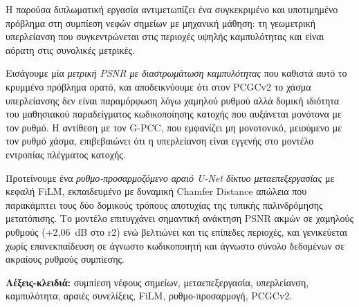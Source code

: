 Η παρούσα διπλωματική εργασία αντιμετωπίζει ένα συγκεκριμένο και υποτιμημένο
πρόβλημα στη συμπίεση νεφών σημείων με μηχανική μάθηση: τη γεωμετρική υπερλείανση
που συγκεντρώνεται στις περιοχές υψηλής καμπυλότητας και είναι αόρατη στις
συνολικές μετρικές.

Εισάγουμε μία \emph{μετρική PSNR με διαστρωμάτωση καμπυλότητας} που καθιστά
αυτό το κρυμμένο πρόβλημα ορατό, και αποδεικνύουμε ότι στον PCGCv2 το χάσμα
υπερλείανσης δεν είναι παραμόρφωση λόγω χαμηλού ρυθμού αλλά δομική ιδιότητα του
μαθησιακού παραδείγματος κωδικοποίησης κατοχής που αυξάνεται μονότονα με τον ρυθμό.
Η αντίθεση με τον G-PCC, που εμφανίζει μη μονοτονικό, μειούμενο με τον ρυθμό
χάσμα, επιβεβαιώνει ότι η υπερλείανση είναι εγγενής στο μοντέλο εντροπίας
πλέγματος κατοχής.

Προτείνουμε ένα \emph{ρυθμο-προσαρμοζόμενο αραιό U-Net δίκτυο μεταεπεξεργασίας}
με κεφαλή FiLM, εκπαιδευμένο με δυναμική Chamfer Distance απώλεια που παρακάμπτει
τους δύο δομικούς τρόπους αποτυχίας της τυπικής παλινδρόμησης μετατόπισης.
Το μοντέλο επιτυγχάνει σημαντική ανάκτηση PSNR ακμών σε χαμηλούς ρυθμούς
(+2,06~dB στο r2) ενώ βελτιώνει και τις επίπεδες περιοχές, και γενικεύεται χωρίς
επανεκπαίδευση σε άγνωστο κωδικοποιητή και άγνωστο σύνολο δεδομένων σε ακραίους
ρυθμούς συμπίεσης.

\vspace{1em}
\noindent\textbf{Λέξεις-κλειδιά:}
συμπίεση νέφους σημείων, μεταεπεξεργασία, υπερλείανση,
καμπυλότητα, αραιές συνελίξεις, FiLM, ρυθμο-προσαρμογή, PCGCv2.

\setcounter{NAT@ctr}{0}

\renewcommand{\thesection}{\thechapter.\arabic{section}}

\cleardoublepage
